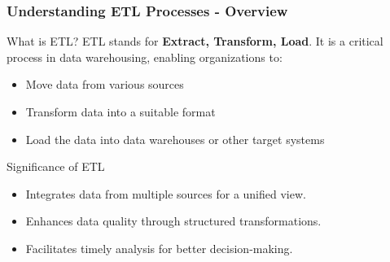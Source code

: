 \documentclass[aspectratio=169]{beamer}
\begin{document}
\begin{frame}[fragile]
    \frametitle{Understanding ETL Processes - Overview}
    \begin{block}{What is ETL?}
        ETL stands for \textbf{Extract, Transform, Load}. It is a critical process in data warehousing, enabling organizations to:
        \begin{itemize}
            \item Move data from various sources
            \item Transform data into a suitable format
            \item Load the data into data warehouses or other target systems
        \end{itemize}
    \end{block}
    \begin{block}{Significance of ETL}
        \begin{itemize}
            \item Integrates data from multiple sources for a unified view.
            \item Enhances data quality through structured transformations.
            \item Facilitates timely analysis for better decision-making.
        \end{itemize}
    \end{block}
\end{frame}
\end{document}
